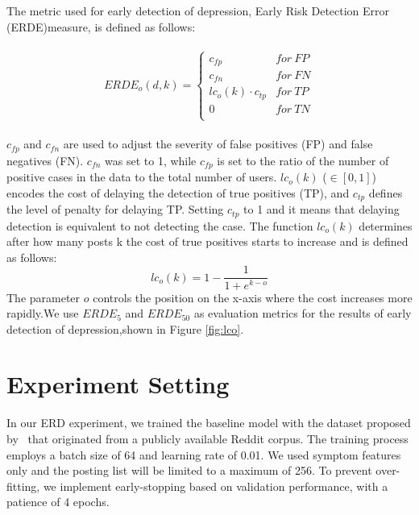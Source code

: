The metric used for early detection of depression, Early Risk Detection Error (ERDE)measure, is defined as follows:

\begin{align*}
\begin{split}
ERDE_o(d,k)= \left \{
\begin{array}{ll}
    c_{fp}    & for \ FP\\
    c_{fn}     & for \ FN\\
    lc_o(k)\cdot c_{tp}    & for\ TP \\
    0     & for\ TN \\ 
\end{array}
\right.
\end{split}
\end{align*}

$c_{fp}$ and $c_{fn}$ are used to adjust the severity of false positives (FP) and false negatives (FN). $c_{fn}$ was set to 1, while $c_{fp}$ is set to the ratio of the number of positive cases in the data to the total number of users. $lc_o(k)$ ($\in [0, 1]$) encodes the cost of delaying the detection of true positives (TP), and $c_{tp}$ defines the level of penalty for delaying TP. Setting $c_{tp}$ to 1  and it means that delaying detection is equivalent to not detecting the case. The function $lc_o(k)$ determines after how many posts k the cost of true positives starts to increase and is defined as follows:
$$lc_o(k)=1-\frac{1}{1+e^{k-o}}$$
The parameter $o$ controls the position on the x-axis where the cost increases more rapidly.We use $ERDE_5$ and $ERDE_{50}$  as evaluation metrics for the results of early detection of depression,shown in Figure \ref{fig:lco}.

\section{Experiment Setting}
\label{sec:appendixD}
In our ERD experiment, we trained the baseline model with the dataset proposed by~\citet{Zhang2022SymptomIF} that originated from a publicly available Reddit corpus. The training process employs a batch size of 64 and learning rate of 0.01. We used symptom features only and the posting list will be limited to a maximum of 256. To prevent over-fitting, we implement early-stopping based on validation performance, with a patience of 4 epochs.



